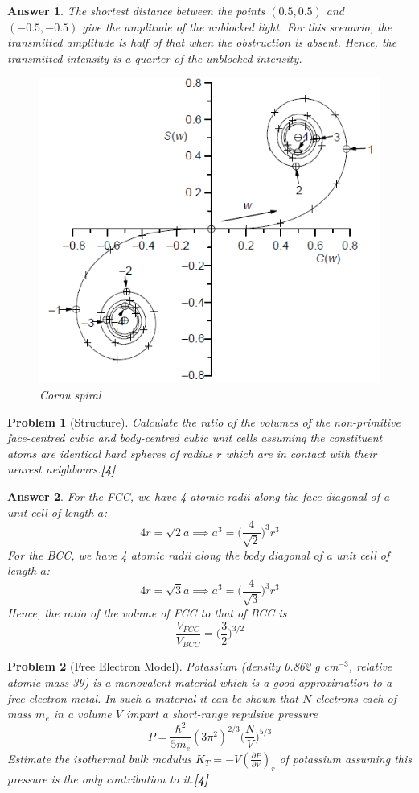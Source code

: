 \documentclass[a4paper]{article}
\newtheorem{ans}{Answer}[subsection]
\theoremstyle{new}
\newtheorem{qns}{Problem}[subsection]
\begin{document}
\begin{ans}
The shortest distance between the points $(0.5,0.5)$ and $(-0.5,-0.5)$ give the amplitude of the unblocked light. For this scenario, the transmitted amplitude is half of that when the obstruction is absent. Hence, the transmitted intensity is a quarter of the unblocked intensity.
\begin{figure}[H]
    \centering
    \includegraphics[scale=0.5]{2010P1B9Q.PNG}
    \caption{Cornu spiral}
\end{figure}
\end{ans}
\newpage
\begin{qns}[Structure]
Calculate the ratio of the volumes of the non-primitive face-centred cubic and body-centred cubic unit cells assuming the constituent atoms are identical hard spheres of radius $r$ which are in contact with their nearest neighbours.\hfill\textbf{[4]}
\end{qns}
\begin{ans}
For the FCC, we have 4 atomic radii along the face diagonal of a unit cell of length $a$:
$$4r=\sqrt{2}a\implies a^3=\bigg(\frac{4}{\sqrt{2}}\bigg)^3r^3$$
For the BCC, we have 4 atomic radii along the body diagonal of a unit cell of length $a$:
$$4r=\sqrt{3}a\implies a^3=\bigg(\frac{4}{\sqrt{3}}\bigg)^3r^3$$
Hence, the ratio of the volume of FCC to that of BCC is
$$\frac{V_{FCC}}{V_{BCC}}=\bigg(\frac{3}{2}\bigg)^{3/2}$$
\end{ans}
\begin{qns}[Free Electron Model]
Potassium (density 0.862 g cm$^{-3}$, relative atomic mass 39) is a monovalent material which is a good approximation to a free-electron metal. In such a material it can be shown that $N$ electrons each of mass $m_e$ in a volume $V$ impart a short-range repulsive pressure
$$P=\frac{\hbar^2}{5m_e}(3\pi^2)^{2/3}\bigg(\frac{N}{V}\bigg)^{5/3}$$
Estimate the isothermal bulk modulus $K_T=-V(\frac{\partial P}{\partial V})_r$ of potassium assuming this pressure is the only contribution to it.\hfill\textbf{[4]}
\end{qns}
\end{document}
